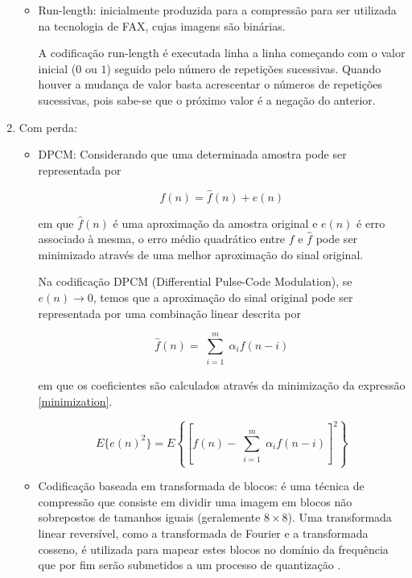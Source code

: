 \begin{enumerate}
\begin{itemize}
\item Run-length: inicialmente produzida para a compressão para ser utilizada na tecnologia de FAX, cujas imagens são binárias. 

A codificação run-length é executada linha a linha começando com o valor inicial ($ 0 $ ou $ 1 $) seguido pelo número de repetições sucessivas. Quando houver a mudança de valor basta acrescentar o números de repetições sucessivas, pois sabe-se que o próximo valor é a negação do anterior.

\end{itemize}
\item Com perda:
\begin{itemize}
\item DPCM: Considerando que uma determinada amostra pode ser representada por 

\begin{equation}
\label{sinal_orig}
f(n) = \hat{f}(n) + e(n)
\end{equation}

em que $ \hat{f}(n) $ é uma aproximação da amostra original e $ e(n) $ é erro associado à mesma, o erro médio quadrático entre $ f $ e $ \hat{f} $  pode ser minimizado através de uma melhor aproximação do sinal original. 

Na codificação DPCM (Differential Pulse-Code Modulation), se $ e(n) \rightarrow 0 $, temos que a aproximação do sinal original pode ser representada por uma combinação linear descrita por

\begin{equation}
\label{sinal_pred}
\hat{f}(n) = \sum_{\substack{i=1}}^{m}\alpha_{i}f(n-i)
\end{equation}

em que os coeficientes são calculados através da minimização da expressão \ref{minimization}.

\begin{equation}
\label{minimization}
E \{ e(n)^{2} \} = E\left\{ \left[ f(n)- \sum_{\substack{i=1}}^{m}\alpha_{i}f(n-i)\right] ^{2} \right\}
\end{equation}

\item Codificação baseada em transformada de blocos: é uma técnica de compressão que consiste em dividir uma imagem em blocos não sobrepostos de tamanhos iguais (geralemente $ 8 \times 8 $). Uma transformada linear reversível, como a transformada de Fourier e a transformada cosseno, é utilizada para mapear estes blocos no domínio da frequência que por fim serão submetidos a um processo de quantização \cite{Gonzalez2006}.
\end{itemize}
\end{enumerate}

